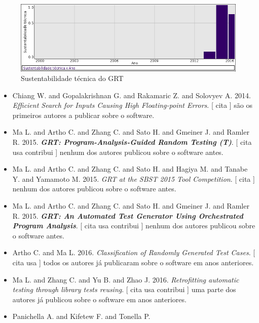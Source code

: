 \begin{figure}[h]
  \center
  \includegraphics[scale=0.50]{imagens/softwares-charts/grt.png}
  \caption{Sustentabilidade técnica do GRT}
\end{figure}


\begin{itemize}
\item Chiang W. and Gopalakrishnan G. and Rakamaric Z. and Solovyev A.
      2014.
        \textit{ Efficient Search for Inputs Causing High Floating-point Errors}.
      [
          cita
      ]
são os primeiros autores a publicar sobre o software.
\item Ma L. and Artho C. and Zhang C. and Sato H. and Gmeiner J. and Ramler R.
      2015.
        \textbf{\textit{ GRT: Program-Analysis-Guided Random Testing (T)}}.
      [
          cita
          usa
          contribui
      ]
nenhum dos autores publicou sobre o software antes.
\item Ma L. and Artho C. and Zhang C. and Sato H. and Hagiya M. and Tanabe Y. and Yamamoto M.
      2015.
        \textit{ GRT at the SBST 2015 Tool Competition}.
      [
          cita
      ]
nenhum dos autores publicou sobre o software antes.
\item Ma L. and Artho C. and Zhang C. and Sato H. and Gmeiner J. and Ramler R.
      2015.
        \textbf{\textit{ GRT: An Automated Test Generator Using Orchestrated Program Analysis}}.
      [
          cita
          usa
          contribui
      ]
nenhum dos autores publicou sobre o software antes.
\item Artho C. and Ma L.
      2016.
        \textit{ Classification of Randomly Generated Test Cases}.
      [
          cita
          usa
      ]
todos os autores já publicaram sobre o software em anos anteriores.
\item Ma L. and Zhang C. and Yu B. and Zhao J.
      2016.
        \textit{ Retrofitting automatic testing through library tests reusing}.
      [
          cita
          usa
          contribui
      ]
uma parte dos autores já publicou sobre o software em anos anteriores.
\item Panichella A. and Kifetew F. and Tonella P.

\end{itemize}
